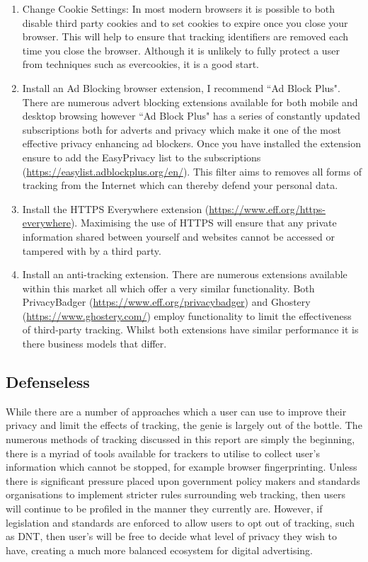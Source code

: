 \documentclass[12pt]{article}
\begin{document}
\begin{enumerate}
    \item Change Cookie Settings: In most modern browsers it is possible to both disable third party cookies and to set cookies to expire once you close your browser. This will help to ensure that tracking identifiers are removed each time you close the browser. Although it is unlikely to fully protect a user from techniques such as evercookies, it is a good start. 
    \item Install an Ad Blocking browser extension, I recommend ``Ad Block Plus". There are numerous advert blocking extensions available for both mobile and desktop browsing however ``Ad Block Plus" has a series of constantly updated subscriptions both for adverts and privacy which make it one of the most effective privacy enhancing ad blockers. Once you have installed the extension ensure to add the EasyPrivacy list to the subscriptions (\url{https://easylist.adblockplus.org/en/}). This filter aims to removes all forms of tracking from the Internet which can thereby defend your personal data.
    \item Install the HTTPS Everywhere extension (\url{https://www.eff.org/https-everywhere}). Maximising the use of HTTPS will ensure that any private information shared between yourself and websites cannot be accessed or tampered with by a third party. 
    \item Install an anti-tracking extension. There are numerous extensions available within this market all which offer a very similar functionality. Both PrivacyBadger (\url{https://www.eff.org/privacybadger}) and Ghostery (\url{https://www.ghostery.com/}) employ functionality to limit the effectiveness of third-party tracking. Whilst both extensions have similar performance it is there business models that differ. 
\end{enumerate}

\subsection{Defenseless}
While there are a number of approaches which a user can use to improve their privacy and limit the effects of tracking, the genie is largely out of the bottle. The numerous methods of tracking discussed in this report are simply the beginning, there is a myriad of tools available for trackers to utilise to collect user's information which cannot be stopped, for example browser fingerprinting. Unless there is significant pressure placed upon government policy makers and standards organisations to implement stricter rules surrounding web tracking, then users will continue to be profiled in the manner they currently are. However, if legislation and standards are enforced to allow users to opt out of tracking, such as DNT, then user's will be free to decide what level of privacy they wish to have, creating a much more balanced ecosystem for digital advertising.
\end{document}

